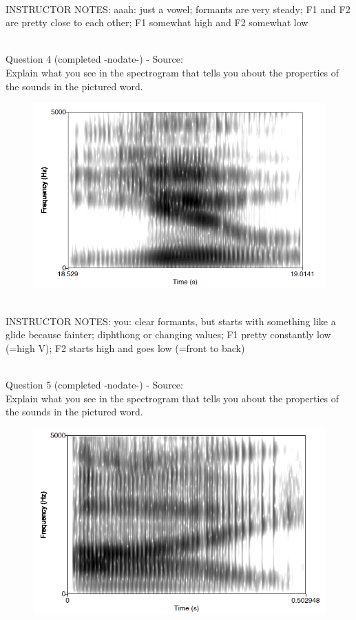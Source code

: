 \documentclass[12pt]{article}
\begin{document}
~\\
INSTRUCTOR NOTES: aaah: just a vowel; formants are very steady; F1 and F2 are pretty close to each other; F1 somewhat high and F2 somewhat low


~\\

{\large Question 4} (completed -nodate-) - Source: \\

Explain what you see in the spectrogram that tells you about the properties of the sounds in the pictured word.\\

\begin{figure}[H]
\includegraphics{../images/spectrogram_you.png}
\end{figure}

~\\
INSTRUCTOR NOTES: you: clear formants, but starts with something like a glide because fainter; diphthong or changing values; F1 pretty constantly low (=high V); F2 starts high and goes low (=front to back)


~\\

{\large Question 5} (completed -nodate-) - Source: \\

Explain what you see in the spectrogram that tells you about the properties of the sounds in the pictured word.\\

\begin{figure}[H]
\includegraphics{../images/spectrogram_I.png}
\end{figure}
\end{document}
